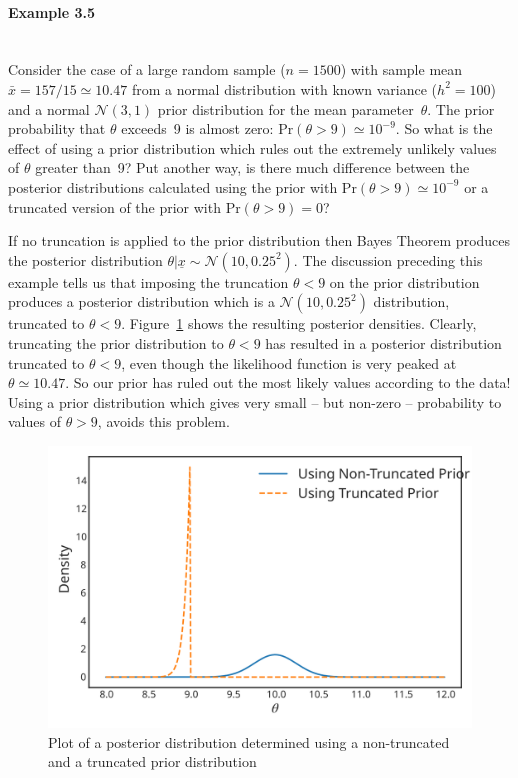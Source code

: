 \paragraph{Example 3.5}{~\\
Consider the case of a large random sample ($n=1500$) with sample mean
$\bar x=157/15\simeq 10.47$ from a normal distribution with known
variance ($h^2=100$) and a normal $\mathcal{N}(3,1)$ prior distribution for the
mean parameter~$\theta$. The prior probability that $\theta$ exceeds~9
is almost zero: $\text{Pr}(\theta>9)\simeq 10^{-9}$. So what is the effect of
using a prior distribution which rules out the extremely unlikely
values of $\theta$ greater than~9? Put another way, is there much
difference between the posterior distributions calculated using the
prior with $\text{Pr}(\theta>9)\simeq 10^{-9}$ or a truncated version of the
prior with $\text{Pr}(\theta>9)=0$?

If no truncation is applied to the prior distribution then Bayes
Theorem produces the posterior distribution $\theta|\underline{x}\sim \mathcal{N}(10,0.25^2)$. The discussion preceding this example tells us that imposing the truncation $\theta<9$ on the prior distribution produces a posterior distribution which is a $\mathcal{N}(10,0.25^2)$ distribution, truncated to $\theta<9$.  Figure~\ref{fig:posttrunc2} shows the resulting posterior densities. Clearly, truncating the prior distribution to $\theta<9$ has resulted in a posterior distribution truncated to $\theta<9$, even though the likelihood function is very peaked at $\theta\simeq 10.47$. So our prior has ruled out the most likely values according to the data! Using a prior distribution which gives very small -- but non-zero -- probability to values of $\theta>9$, avoids this problem.
\begin{figure}[h!]

\includegraphics{images/truncposterior2.svg}
\caption{Plot of a posterior distribution determined using a
non-truncated and a truncated prior distribution}
\label{fig:posttrunc2}

\end{figure}}

